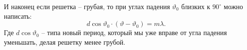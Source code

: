 И наконец если решетка -- грубая, то при углах падения $\vartheta_0$ близких к $90^\circ$ можно написать:
\begin{equation*}
	d \cos \vartheta_0 \cdot (\vartheta - \vartheta_0) = m \lambda.
\end{equation*}
Где $d \cos \vartheta_0$ -- типа новый период, который мы уже вправе от угла падения уменьшать, делая решетку менее грубой.